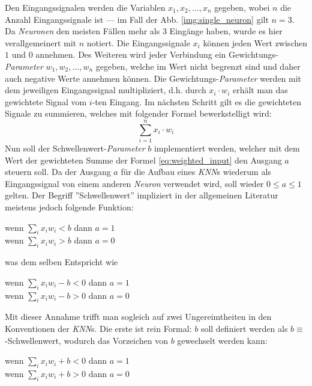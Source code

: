 Den Eingangssignalen werden die Variablen  $x_1, x_2,...,x_n$ gegeben, wobei $n$ die Anzahl Eingangssignale ist --- im Fall der Abb. \ref{img:single_neuron} gilt $n=3$. Da \textit{Neuronen} den meisten Fällen mehr als $3$ Eingänge haben, wurde es hier verallgemeinert mit $n$ notiert. Die Eingangssignale $x_i$ können jeden Wert zwischen $1$ und $0$ annehmen. Des Weiteren wird jeder Verbindung ein Gewichtungs-\textit{Parameter} $w_1, w_2,...,w_n$ gegeben, welche im Wert nicht begrenzt sind und daher auch negative Werte annehmen können. Die Gewichtungs-\textit{Parameter} werden mit dem jeweiligen Eingangssignal multipliziert, d.h. durch $x_i\cdot w_i$ erhält man das gewichtete Signal vom $i$-ten Eingang. Im nächsten Schritt gilt es die gewichteten Signale zu summieren, welches mit folgender Formel bewerkstelligt wird:
\begin{equation}\label{eq:weighted_input}
	\sum_{i=1}^{n} x_i\cdot w_i
\end{equation}
Nun soll der Schwellenwert-\textit{Parameter} $b$ implementiert werden, welcher mit dem Wert der gewichteten Summe der Formel \ref{eq:weighted_input} den Ausgang $a$ steuern soll. Da der Ausgang $a$ für die Aufbau eines \textit{KNN}s wiederum als Eingangssignal von einem anderen \textit{Neuron} verwendet wird, soll wieder $0\leq a \leq 1$ gelten. Der Begriff ''Schwellenwert'' impliziert in der allgemeinen Literatur meistens jedoch folgende Funktion:
\begin{center}
	\begin{minipage}{7cm}
		wenn $\sum_{i}x_iw_i < b$ dann $a=1$\\
		wenn $\sum_{i}x_iw_i > b$ dann $a=0$
	\end{minipage}
\end{center}
was dem selben Entspricht wie
\begin{center}
\begin{minipage}{7cm}
	wenn $\sum_{i}x_iw_i - b < 0$ dann $a=1$\\
	wenn $\sum_{i}x_iw_i - b > 0$ dann $a=0$
\end{minipage}
\end{center}
Mit dieser Annahme trifft man sogleich auf zwei Ungereimtheiten in den Konventionen der \textit{KNN}s. Die erste ist rein Formal: $b$ soll definiert werden als $b \equiv$ -Schwellenwert, wodurch das Vorzeichen von $b$ gewechselt werden kann:
\begin{center}
	\begin{minipage}{7cm}
		wenn $\sum_{i}x_iw_i + b < 0$ dann $a=1$\\
		wenn $\sum_{i}x_iw_i + b > 0$ dann $a=0$
	\end{minipage}
\end{center}
